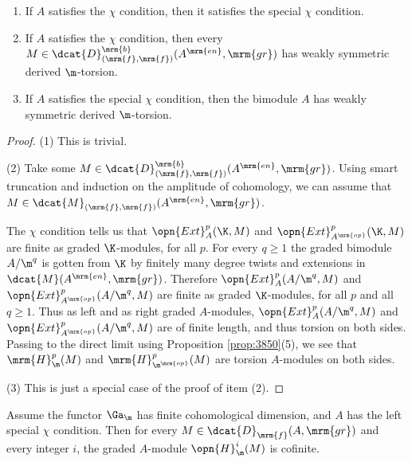 \begin{prop} \label{prop:3712}
\mbox{}
\begin{enumerate}
\item If $A$ satisfies the $\chi$ condition, then it satisfies 
the special $\chi$ condition. 

\item If $A$ satisfies the $\chi$ condition, then every
$M \in \dcat{D}^{\mrm{b}}_{(\mrm{f}, \mrm{f})}(A^{\mrm{en}}, \mrm{gr})$
has weakly symmetric derived $\m$-torsion. 

\item If $A$ satisfies the special $\chi$ condition, 
then the bimodule $A$ has weakly symmetric derived $\m$-torsion. 
\end{enumerate}
\end{prop}

\begin{proof} \mbox{}

\smallskip \noindent 
(1) This is trivial.

\medskip \noindent
(2) Take some 
$M \in \dcat{D}^{\mrm{b}}_{(\mrm{f}, \mrm{f})}(A^{\mrm{en}}, \mrm{gr})$.
Using smart truncation and induction on the amplitude of cohomology, 
we can assume that 
$M \in \dcat{M}_{(\mrm{f}, \mrm{f})}(A^{\mrm{en}}, \mrm{gr})$.

The $\chi$ condition tells us that $\opn{Ext}^p_{A}(\K, M)$ and 
$\opn{Ext}^p_{A^{\mrm{op}}}(\K, M)$ 
are finite as graded $\K$-modules, for all $p$. For every $q \geq 1$ the graded 
bimodule $A / \m^q$ is gotten from $\K$ by finitely many degree twists and 
extensions in $\dcat{M}(A^{\mrm{en}}, \mrm{gr})$. Therefore 
$\opn{Ext}^p_{A}(A / \m^q, M)$ and 
$\opn{Ext}^p_{A^{\mrm{op}}}(A / \m^q, M)$
are finite as graded $\K$-modules, for all $p$ and all $q \geq 1$. 
Thus as left and as right graded $A$-modules, 
$\opn{Ext}^p_{A}(A / \m^q, M)$ and 
$\opn{Ext}^p_{A^{\mrm{op}}}(A / \m^q, M)$
are of finite length, and thus torsion on both sides. Passing to the direct 
limit using Proposition \ref{prop:3850}(5), we see that $\mrm{H}^p_{\m}(M)$ and 
$\mrm{H}^p_{\m^{\mrm{op}}}(M)$ are torsion $A$-modules on both sides. 

\medskip \noindent
(3) This is just a special case of the proof of item (2). 
\end{proof}

\begin{lem} \label{lem:3870}
Assume the functor $\Ga_{\m}$ has finite cohomological dimension, and  $A$ has 
the left special $\chi$ condition. Then for every
$M \in \dcat{D}_{\mrm{f}}(A, \mrm{gr})$
and every integer $i$, the  graded $A$-module $\opn{H}^i_{\m}(M)$ is cofinite. 
\end{lem}

